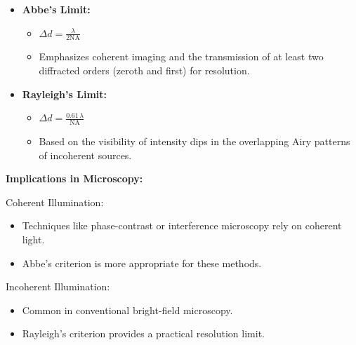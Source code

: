 \documentclass[
  a4paper,
]{book}
\providecommand{\tightlist}{%
  \setlength{\itemsep}{0pt}\setlength{\parskip}{0pt}}
\begin{document}
\begin{tcolorbox}[enhanced jigsaw, breakable, toptitle=1mm, bottomrule=.15mm, colbacktitle=quarto-callout-note-color!10!white, title=\textcolor{quarto-callout-note-color}{\faInfo}\hspace{0.5em}{Rayleigh's and Abbe's criteria}, arc=.35mm, rightrule=.15mm, bottomtitle=1mm, opacityback=0, toprule=.15mm, coltitle=black, leftrule=.75mm, opacitybacktitle=0.6, colback=white, left=2mm, titlerule=0mm, colframe=quarto-callout-note-color-frame]

\begin{itemize}
\item
  \textbf{Abbe's Limit:}

  \begin{itemize}
  \tightlist
  \item
    \(\Delta d = \frac{\lambda}{2 \text{NA}}\)
  \item
    Emphasizes coherent imaging and the transmission of at least two
    diffracted orders (zeroth and first) for resolution.
  \end{itemize}
\item
  \textbf{Rayleigh's Limit:}

  \begin{itemize}
  \tightlist
  \item
    \(\Delta d = \frac{0.61\, \lambda}{\text{NA}}\)
  \item
    Based on the visibility of intensity dips in the overlapping Airy
    patterns of incoherent sources.
  \end{itemize}
\end{itemize}

\textbf{Implications in Microscopy:}

Coherent Illumination:

\begin{itemize}
\tightlist
\item
  Techniques like phase-contrast or interference microscopy rely on
  coherent light.
\item
  Abbe's criterion is more appropriate for these methods.
\end{itemize}

Incoherent Illumination:

\begin{itemize}
\tightlist
\item
  Common in conventional bright-field microscopy.
\item
  Rayleigh's criterion provides a practical resolution limit.
\end{itemize}


\end{tcolorbox}
\end{document}
